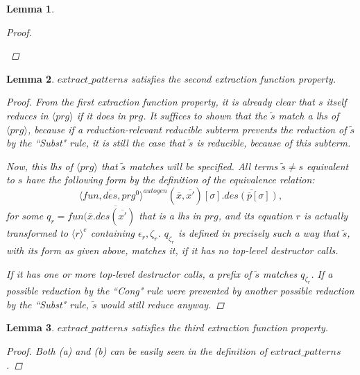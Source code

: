\documentclass[11pt]{article} %
\newtheorem*{lemma*}{Lemma}
\begin{document}
\begin{lemma*}
\begin{proof}
\begin{enumerate}
\end{enumerate}

\end{proof}

\end{lemma*}

\begin{lemma*}

$extract\_patterns$ satisfies the second extraction function property.

\begin{proof}

From the first extraction function property, it is already clear that $s$ itself reduces in $\langle prg \rangle$ if it does in $prg$. It suffices to shown that the $\widetilde{s}$ match a lhs of $\langle prg \rangle$, because if a reduction-relevant reducible subterm prevents the reduction of $\widetilde{s}$ by the ``Subst" rule, it is still the case that $\widetilde{s}$ is reducible, because of this subterm.

Now, this lhs of $\langle prg \rangle$ that $\widetilde{s}$ matches will be specified. All terms $\widetilde{s} \neq s$ equivalent to $s$ have the following form by the definition of the equivalence relation:
\begin{equation*}
\langle fun, \overline{des}, prg^0 \rangle^{autogen}(\overline{x}, \overline{x'})[\sigma].\overline{des(\overline{p}[\sigma])},
\end{equation*}
for some $q_r = fun(\overline{x}.\overline{des(\overline{x'})}$ that is a lhs in $prg$, and its equation $r$ is actually transformed to $\langle r \rangle^e$ containing $\epsilon_r, \zeta_r$. $q_{\zeta_r}$ is defined in precisely such a way that $\widetilde{s}$, with its form as given above, matches it, if it has no top-level destructor calls.

If it has one or more top-level destructor calls, a prefix of $\widetilde{s}$ matches $q_{\zeta_r}$. If a possible reduction by the ``Cong" rule were prevented by another possible reduction by the ``Subst" rule, $\widetilde{s}$ would still reduce anyway.

\end{proof}

\end{lemma*}

\begin{lemma*}

$extract\_patterns$ satisfies the third extraction function property.

\begin{proof}

Both (a) and (b) can be easily seen in the definition of $extract\_patterns$.

\end{proof}

\end{lemma*}
\end{document}
